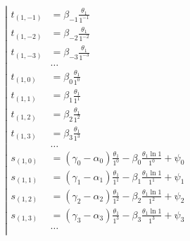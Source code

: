 \begin{equation*} \left| \begin{aligned}
t_{(1,-1)} &=
  \beta_{-1} \frac{\theta_1}{1^{-1}} \\
%
t_{(1,-2)} &=
  \beta_{-2} \frac{\theta_1}{1^{-2}} \\
%
t_{(1,-3)} &=
  \beta_{-3} \frac{\theta_1}{1^{-3}} \\
%
&\ldots \\
%
t_{(1,0)} &=
  \beta_0 \frac{\theta_1}{1^0} \\
%
t_{(1,1)} &=
  \beta_1 \frac{\theta_1}{1^1} \\
%
t_{(1,2)} &=
  \beta_2 \frac{\theta_1}{1^2} \\
%
t_{(1,3)} &=
  \beta_3 \frac{\theta_1}{1^3} \\
%
&\ldots \\
%
s_{(1,0)} &=
  (\gamma_0 - \alpha_0) \frac{\theta_1}{1^0}
- \beta_0 \frac{\theta_1 \ln{1}}{1^0}
+ \psi_0 \\
%
s_{(1,1)} &=
  (\gamma_1 - \alpha_1) \frac{\theta_1}{1^1}
- \beta_1 \frac{\theta_1 \ln{1}}{1^1}
+ \psi_1 \\
%
s_{(1,2)} &=
  (\gamma_2 - \alpha_2) \frac{\theta_1}{1^2}
- \beta_2 \frac{\theta_1 \ln{1}}{1^2}
+ \psi_2 \\
%
s_{(1,3)} &=
  (\gamma_3 - \alpha_3) \frac{\theta_1}{1^3}
- \beta_3 \frac{\theta_1 \ln{1}}{1^3}
+ \psi_3 \\
%
&\ldots \\
\end{aligned} \right. \end{equation*}

